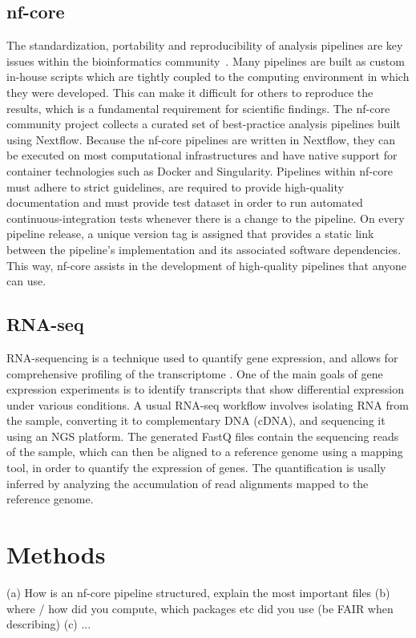 \documentclass{article}
\theoremstyle{plain}
\theoremstyle{definition}
\theoremstyle{remark}
\begin{document}
\subsection{nf-core}
The standardization, portability and reproducibility of analysis pipelines are key issues within the bioinformatics community~\cite{ewels2020nf}. Many pipelines are built as custom in-house scripts which are tightly coupled to the computing environment in which they were developed. This can make it difficult for others to reproduce the results, which is a fundamental requirement for scientific findings. The nf-core community project collects a curated set of best-practice analysis pipelines built using Nextflow. Because the nf-core pipelines are written in Nextflow, they can be executed on most computational infrastructures and have native support for container technologies such as Docker and Singularity. Pipelines within nf-core must adhere to strict guidelines, are required to provide high-quality documentation and must provide test dataset in order to run automated continuous-integration tests whenever there is a change to the pipeline. On every pipeline release, a unique version tag is assigned that provides a static link between the pipeline’s implementation and its associated software dependencies. This way, nf-core assists in the development of high-quality pipelines that anyone can use.
\subsection{RNA-seq}
RNA-sequencing is a technique used to quantify gene expression, and allows for comprehensive profiling of the transcriptome \cite{Kukurba2015}. One of the main goals of gene expression experiments is to identify transcripts that show differential expression under various conditions. A usual RNA-seq workflow involves isolating RNA from the sample, converting it to complementary DNA (cDNA), and sequencing it using an NGS platform. The generated FastQ files contain the sequencing reads of the sample, which can then be aligned to a reference genome using a mapping tool, in order to quantify the expression of genes. The quantification is usally inferred by analyzing the accumulation of read alignments mapped to the reference genome.

\section{Methods}
(a) How is an nf-core pipeline structured, explain the most important files
(b) where / how did you compute, which packages etc did you use (be FAIR when describing)
(c) ...
\end{document}
